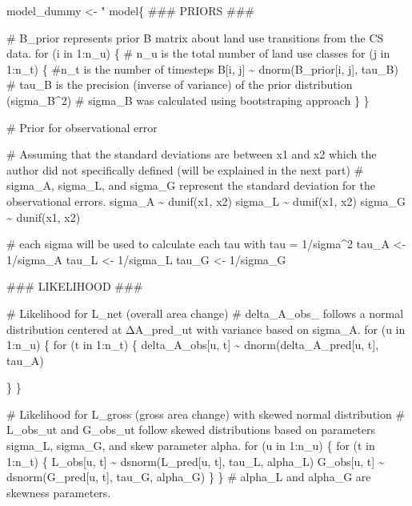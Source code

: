 \documentclass[
  letterpaper,
  DIV=11,
  numbers=noendperiod]{scrartcl}
\newenvironment{Shaded}{\begin{snugshade}}{\end{snugshade}}
\newcommand{\NormalTok}[1]{\textcolor[rgb]{0.00,0.23,0.31}{#1}}
\newcommand{\OtherTok}[1]{\textcolor[rgb]{0.00,0.23,0.31}{#1}}
\newcommand{\StringTok}[1]{\textcolor[rgb]{0.13,0.47,0.30}{#1}}
\begin{document}
\begin{Shaded}
\begin{Highlighting}[]
\NormalTok{model\_dummy }\OtherTok{\textless{}{-}} \StringTok{"}
\StringTok{model\{}
\StringTok{  }
\StringTok{\#\#\# PRIORS \#\#\#}

\StringTok{\# B\_prior represents prior B matrix about land use transitions from the CS data.}
\StringTok{for (i in 1:n\_u) \{ \# n\_u is the total number of land use classes}
\StringTok{  for (j in 1:n\_t) \{ \#n\_t is the number of timesteps}
\StringTok{    B[i, j] \textasciitilde{} dnorm(B\_prior[i, j], tau\_B) \# tau\_B is the precision (inverse of variance) of the prior distribution (sigma\_B\^{}2)}
\StringTok{\# sigma\_B was calculated using bootstraping approach}
\StringTok{  \}}
\StringTok{\}}

\StringTok{\# Prior for observational error}

\StringTok{\# Assuming that the standard deviations are between x1 and x2 which the author did not specifically defined (will be explained in the next part)}
\StringTok{\# sigma\_A, sigma\_L, and sigma\_G represent the standard deviation for the observational errors.}
\StringTok{sigma\_A \textasciitilde{} dunif(x1, x2)  }
\StringTok{sigma\_L \textasciitilde{} dunif(x1, x2)  }
\StringTok{sigma\_G \textasciitilde{} dunif(x1, x2)}

\StringTok{\# each sigma will be used to calculate each tau with tau = 1/sigma\^{}2}
\StringTok{tau\_A \textless{}{-} 1/sigma\_A}
\StringTok{tau\_L \textless{}{-} 1/sigma\_L}
\StringTok{tau\_G \textless{}{-} 1/sigma\_G}

\StringTok{\#\#\# LIKELIHOOD \#\#\#}

\StringTok{\# Likelihood for L\_net (overall area change)}
\StringTok{\# delta\_A\_obs\_ follows a normal distribution centered at ΔA\_pred\_ut with variance based on sigma\_A.}
\StringTok{for (u in 1:n\_u) \{}
\StringTok{  for (t in 1:n\_t) \{}
\StringTok{    delta\_A\_obs[u, t] \textasciitilde{} dnorm(delta\_A\_pred[u, t], tau\_A)}

\StringTok{  \}}
\StringTok{\}}

\StringTok{\# Likelihood for L\_gross (gross area change) with skewed normal distribution}
\StringTok{\# L\_obs\_ut and G\_obs\_ut follow skewed distributions based on parameters sigma\_L, sigma\_G, and skew parameter alpha.}
\StringTok{for (u in 1:n\_u) \{}
\StringTok{  for (t in 1:n\_t) \{}
\StringTok{    L\_obs[u, t] \textasciitilde{} dsnorm(L\_pred[u, t], tau\_L, alpha\_L)}
\StringTok{    G\_obs[u, t] \textasciitilde{} dsnorm(G\_pred[u, t], tau\_G, alpha\_G)}
\StringTok{  \}}
\StringTok{\}}
\StringTok{\# alpha\_L and alpha\_G are skewness parameters.}


\end{Highlighting}
\end{Shaded}
\end{document}
